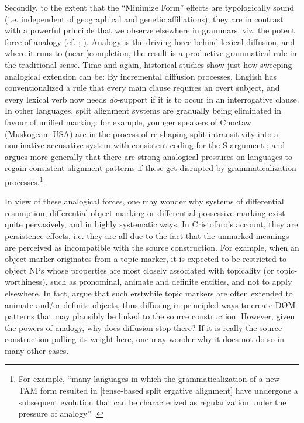 \documentclass[output=paper]{langsci/langscibook}
\begin{document}
Secondly, to the extent that the “Minimize Form” effects are typologically sound (i.e. independent of geographical and genetic affiliations), they are in contrast with a powerful principle that we observe elsewhere in grammars, viz. the potent force of analogy (cf. \citealt{GentnerSmith2012}; \citealt{BlevinsBlevins2009}). Analogy is the driving force behind lexical diffusion, and where it runs to (near-)completion, the result is a productive grammatical rule in the traditional sense. Time and again, historical studies show just how sweeping analogical extension can be: By incremental diffusion processes, English has conventionalized a rule that every main clause requires an overt subject, and every lexical verb now needs \textit{do}{}-support if it is to occur in an interrogative clause. In other languages, split alignment systems are gradually being eliminated in favour of unified marking: for example, younger speakers of Choctaw (Muskogean: USA) are in the process of re-shaping split intransitivity into a nominative-accusative system with consistent coding for the S argument \citep[140]{Broadwell2006}; and \citet{Creissels2018} argues more generally that there are strong analogical pressures on languages to regain consistent alignment patterns if these get disrupted by grammaticalization processes.\footnote{For example, “many languages in which the grammaticalization of a new TAM form resulted in [tense-based split ergative alignment] have undergone a subsequent evolution that can be characterized as regularization under the pressure of analogy” \citep[81]{Creissels2018}.} 

In view of these analogical forces, one may wonder why systems of differential resumption, differential object marking or differential possessive marking exist quite pervasively, and in highly systematic ways. In Cristofaro’s account, they are persistence effects, i.e. they are all due to the fact that the unmarked meanings are perceived as incompatible with the source construction. For example, when an object marker originates from a topic marker, it is expected to be restricted to object NPs whose properties are most closely associated with topicality (or topic-worthiness), such as pronominal, animate and definite entities, and not to apply elsewhere. In fact, \citet{DalrympleNikolaeva2011} argue that such erstwhile topic markers are often extended to animate and/or definite objects, thus diffusing in principled ways to create DOM patterns that may plausibly be linked to the source construction. However, given the powers of analogy, why does diffusion stop there? If it is really the source construction pulling its weight here, one may wonder why it does not do so in many other cases. 
\end{document}
